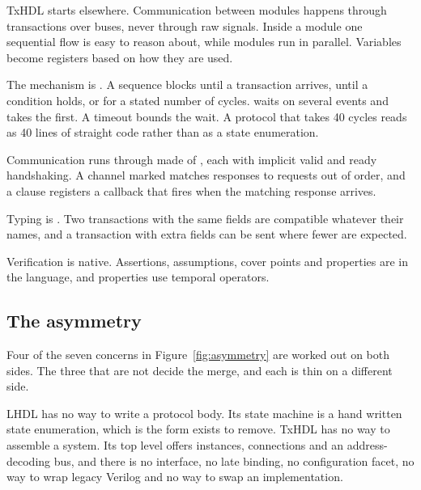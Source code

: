 TxHDL starts elsewhere. Communication between modules happens through
transactions over buses, never through raw signals. Inside a module one
sequential flow is easy to reason about, while modules run in parallel.
Variables become registers based on how they are used.

The mechanism is . A sequence blocks until a transaction
arrives, until a condition holds, or for a stated number of cycles.
 waits on several events and takes the first. A timeout bounds
the wait. A protocol that takes 40 cycles reads as 40 lines of straight
code rather than as a state enumeration.

Communication runs through  made of , each with
implicit valid and ready handshaking. A channel marked 
matches responses to requests out of order, and a  clause
registers a callback that fires when the matching response arrives.

Typing is . Two transactions with the same fields are
compatible whatever their names, and a transaction with extra fields can be
sent where fewer are expected.

Verification is native. Assertions, assumptions, cover points and
properties are in the language, and properties use temporal operators.

\subsection{The asymmetry}

Four of the seven concerns in Figure~\ref{fig:asymmetry} are worked out on
both sides. The three that are not decide the merge, and each is thin on a
different side.

LHDL has no way to write a protocol body. Its state machine is a hand
written state enumeration, which is the form  exists to remove.
TxHDL has no way to assemble a system. Its top level offers instances,
connections and an address-decoding bus, and there is no interface, no late
binding, no configuration facet, no way to wrap legacy Verilog and no way to
swap an implementation.

